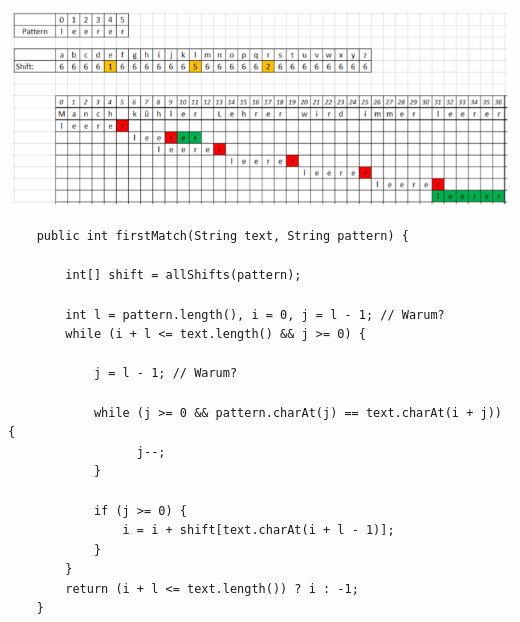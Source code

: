 \includegraphics[width=\linewidth]{images/boyermoore}

\begin{verbatim}
    public int firstMatch(String text, String pattern) {

        int[] shift = allShifts(pattern);

        int l = pattern.length(), i = 0, j = l - 1; // Warum?
        while (i + l <= text.length() && j >= 0) {

            j = l - 1; // Warum?

            while (j >= 0 && pattern.charAt(j) == text.charAt(i + j)) {
                  j--;
            }

            if (j >= 0) {
                i = i + shift[text.charAt(i + l - 1)];
            }
        }
        return (i + l <= text.length()) ? i : -1;
    }
\end{verbatim}